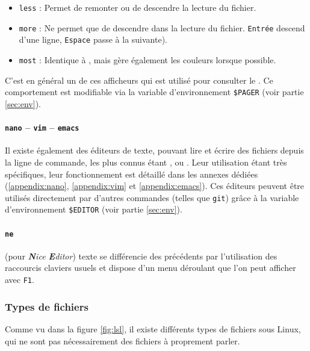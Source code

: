 \begin{itemize}
    \item \texttt{less} : Permet de remonter ou de descendre la lecture du fichier.
    \item \texttt{more} : Ne permet que de descendre dans la lecture du fichier.
    \texttt{Entrée} descend d'une ligne, \texttt{Espace} passe à la  suivante).
    \item \texttt{most} : Identique à , mais gère également les couleurs lorsque possible.
\end{itemize}\vspace{-3mm}

 C'est en général un de ces afficheurs qui est utilisé pour consulter le . Ce comportement est modifiable via la variable d'environnement \texttt{\$PAGER} (voir partie \ref{sec:env}).

\paragraph{\texttt{nano} -- \texttt{vim} -- \texttt{emacs}}
Il existe également des éditeurs de texte, pouvant lire et écrire des fichiers depuis la ligne de commande, les plus connus étant ,  ou . Leur utilisation étant très spécifiques, leur fonctionnement est détaillé dans les annexes dédiées (\ref{appendix:nano},  \ref{appendix:vim} et  \ref{appendix:emacs}). \newline
Ces éditeurs peuvent être utilisés directement par d'autres commandes (telles que \texttt{git}) grâce à la variable d'environnement \texttt{\$EDITOR} (voir partie \ref{sec:env}).

\paragraph{\texttt{ne}}
 (pour \textit{\textbf{N}ice \textbf{E}ditor}) texte se différencie des précédents par l'utilisation des raccourcis claviers usuels et dispose d'un menu déroulant que l'on peut afficher avec \texttt{F1}.

\newpage
\subsubsection{Types de fichiers} \label{sec:filetypes}

Comme vu dans la figure \ref{fig:lsl}, il existe différents types de fichiers sous Linux, qui ne sont pas nécessairement des fichiers à proprement parler.

